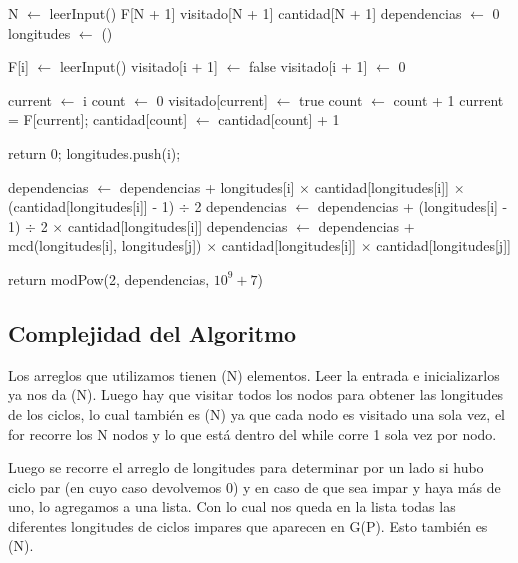 	\begin{algorithmic}
		\State N $\gets$ leerInput()
		\State F[N + 1]
		\State visitado[N + 1]
		\State cantidad[N + 1]
		\State dependencias $\gets$ 0
		\State longitudes $\gets$ ()

			\State F[i] $\gets$ leerInput()
			\State visitado[i + 1] $\gets$ false
			\State visitado[i + 1] $\gets$ 0
		\EndFor

			\State current $\gets$ i
			\State count $\gets$ 0
				\State visitado[current] $\gets$ true
				\State count $\gets$ count + 1
				\State current = F[current];
			\EndWhile
			\State cantidad[count] $\gets$ cantidad[count] + 1
		\EndFor

				\State return 0;
			\EndIf
				\State longitudes.push(i);
			\EndIf
		\EndFor

			\State dependencias $\gets$ dependencias + longitudes[i] $\times $ cantidad[longitudes[i]] $\times$ (cantidad[longitudes[i]] - 1) $\div$ 2 
			\State dependencias $\gets$ dependencias + (longitudes[i] - 1) $\div$ 2 $\times$ cantidad[longitudes[i]] 
				\State dependencias $\gets$ dependencias + mcd(longitudes[i], longitudes[j]) $\times$ cantidad[longitudes[i]] $\times$ cantidad[longitudes[j]]
			\EndFor
		\EndFor

		\State return modPow(2, dependencias, $10^9 + 7$)

	\end{algorithmic}


\subsection{Complejidad del Algoritmo}	

	Los arreglos que utilizamos tienen \bigo(N) elementos. Leer la entrada e inicializarlos ya nos da \bigo(N). Luego hay que visitar todos los nodos para obtener las longitudes de los ciclos, lo cual también es \bigo(N) ya que cada nodo es visitado una sola vez, el for recorre los N nodos y lo que está dentro del while corre 1 sola vez por nodo. \newline

	Luego se recorre el arreglo de longitudes para determinar por un lado si hubo ciclo par (en cuyo caso devolvemos 0) y en caso de que sea impar y haya más de uno, lo agregamos a una lista. Con lo cual nos queda en la lista todas las diferentes longitudes de ciclos impares que aparecen en G(P). Esto también es \bigo(N). \newline

